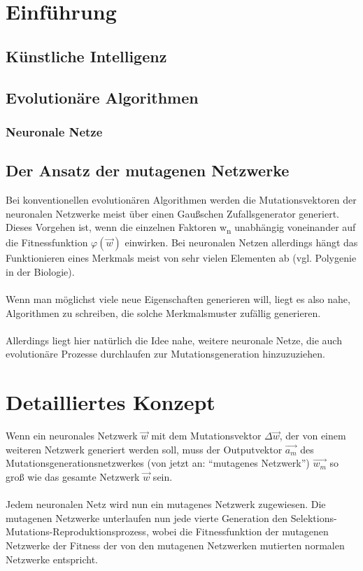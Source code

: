 \documentclass{article}
\begin{document}
	
	\tableofcontents
	
	\newpage
	
	\section{Einführung}
	
	\subsection{Künstliche Intelligenz}
	
	\subsection{Evolutionäre Algorithmen}
	
	
	\subsubsection{Neuronale Netze}
	
	
	\subsection{Der Ansatz der mutagenen Netzwerke}
	
	Bei konventionellen evolutionären Algorithmen werden die Mutationsvektoren der neuronalen Netzwerke meist über einen Gaußschen Zufallsgenerator generiert. Dieses Vorgehen ist, wenn die einzelnen Faktoren w\textsubscript{n} unabhängig voneinander auf die Fitnessfunktion $\varphi(\vec{w})$ einwirken. Bei neuronalen Netzen allerdings hängt das Funktionieren eines Merkmals meist von sehr vielen Elementen ab (vgl. Polygenie in der Biologie).
	\\\\
	Wenn man möglichst viele neue Eigenschaften generieren will, liegt es also nahe, Algorithmen zu schreiben, die solche Merkmalsmuster zufällig generieren.
	\\\\
	Allerdings liegt hier natürlich die Idee nahe, weitere neuronale Netze, die auch evolutionäre Prozesse durchlaufen zur Mutationsgeneration hinzuzuziehen.
	
	\newpage
	\section{Detailliertes Konzept}
	
	Wenn ein neuronales Netzwerk $\vec{w}$ mit dem Mutationsvektor $\Delta\vec{w}$, der von einem weiteren Netzwerk generiert werden soll, muss der Outputvektor $\vec{a_m}$  des Mutationsgenerationsnetzwerkes (von jetzt an: "`mutagenes Netzwerk"') $\vec{w_m}$ so groß wie das gesamte Netzwerk $\vec{w}$ sein.
	\\\\
	Jedem neuronalen Netz wird nun ein mutagenes Netzwerk zugewiesen. Die mutagenen Netzwerke unterlaufen nun jede vierte Generation den Selektions-Mutations-Reproduktionsprozess, wobei die Fitnessfunktion der mutagenen Netzwerke der Fitness der von den mutagenen Netzwerken mutierten normalen Netzwerke entspricht.
	
	
	
	
	
\end{document}
